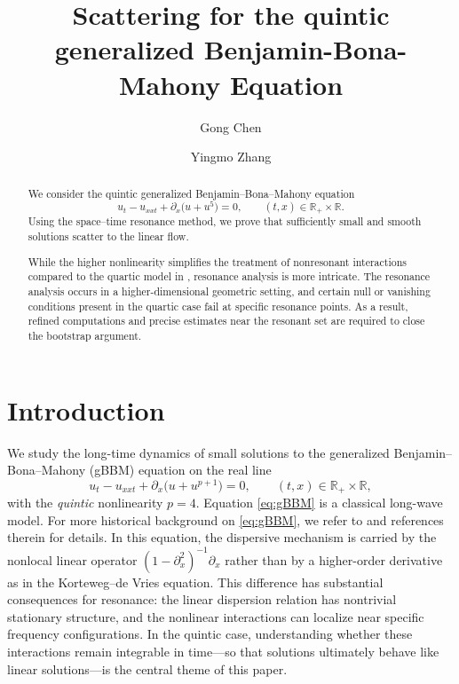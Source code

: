 \documentclass[reqno,english,11pt]{amsart}
\newcommand\R{\mathbb{R}}
\theoremstyle{definition}
\numberwithin{equation}{section}
\begin{document}
\title{Scattering for the quintic generalized Benjamin-Bona-Mahony Equation}

\author[G.~Chen]{Gong Chen}
\author[Y.~Zhang]{Yingmo Zhang}
\address{Department of Mathematics, University of Wisconsin--Madison, Madison, WI 53706, USA}
\address{School of Mathematics, Georgia Institute of Technology, Atlanta, GA 30332, USA}


\begin{abstract}
We consider the quintic generalized Benjamin–Bona–Mahony equation
\begin{equation*}
    u_t-u_{xxt}+\partial_x\big(u+u^{5}\big)=0,\qquad (t,x)\in \R_+\times\R.
\end{equation*}
Using the space–time resonance method, we prove that sufficiently small and smooth solutions scatter to the linear flow.

While the higher nonlinearity simplifies the treatment of nonresonant interactions compared to the quartic model in \cite{Morgan}, resonance analysis is more intricate. The resonance analysis occurs in a higher-dimensional geometric setting, and certain null or vanishing conditions present in the quartic case fail at specific resonance points. As a result, refined computations and precise estimates near the resonant set are required to close the bootstrap argument.


\end{abstract}
\maketitle
\tableofcontents 


 \section{Introduction}


We study the long-time dynamics of small solutions to the generalized Benjamin--Bona--Mahony (gBBM) equation on the real line
\begin{equation}\label{eq:gBBM} 
u_t-u_{xxt}+\partial_x\big(u+u^{p+1}\big)=0,\qquad (t,x)\in \R_+\times\R,
\end{equation}
with the \emph{quintic} nonlinearity $p=4$.  Equation \eqref{eq:gBBM} is a classical long-wave model.  For more historical background on \eqref{eq:gBBM}, we refer to \cite{Morgan} and references therein for details. In this equation,  the dispersive mechanism is carried by the nonlocal linear operator $(1-\partial_x^2)^{-1}\partial_x$ rather than by a higher-order derivative as in the Korteweg–de Vries equation.  This  difference has substantial consequences for resonance: the linear dispersion relation has nontrivial stationary structure, and the nonlinear interactions can localize near specific frequency configurations. In the quintic case,  understanding whether these interactions remain integrable in time---so that solutions ultimately behave like linear solutions---is the central theme of this paper.
\end{document}
